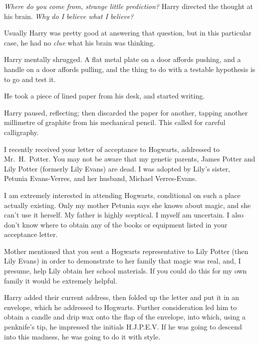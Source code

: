 \emph{Where do you come from, strange little prediction?} Harry directed the
thought at his brain. \emph{Why do I believe what I believe?}

Usually Harry was pretty good at answering that question, but in this
particular case, he had no \emph{clue} what his brain was thinking.

Harry mentally shrugged. A flat metal plate on a door affords pushing, and a
handle on a door affords pulling, and the thing to do with a testable
hypothesis is to go and test it.

He took a piece of lined paper from his desk, and started writing.

\begin{writtenNote}
\end{writtenNote}

Harry paused, reflecting; then discarded the paper for another, tapping another
millimetre of graphite from his mechanical pencil. This called for careful
calligraphy.

\begin{writtenNote}


I recently received your letter of acceptance to Hogwarts, addressed to
Mr.~H.~Potter. You may not be aware that my genetic parents, James Potter and
Lily Potter (formerly Lily Evans) are dead. I was adopted by Lily's sister,
Petunia Evans-Verres, and her husband, Michael Verres-Evans.

I am extremely interested in attending Hogwarts, conditional on such a
place actually existing. Only my mother Petunia says she knows about magic, and
she can't use it herself. My father is highly sceptical. I myself am uncertain.
I also don't know where to obtain any of the books or equipment listed in your
acceptance letter.

Mother mentioned that you sent a Hogwarts representative to Lily Potter
(then Lily Evans) in order to demonstrate to her family that magic was real,
and, I presume, help Lily obtain her school materials. If you could do this for
my own family it would be extremely helpful.

\end{writtenNote}

Harry added their current address, then folded up the letter and put it in an
envelope, which he addressed to Hogwarts. Further consideration led him to
obtain a candle and drip wax onto the flap of the envelope, into which, using a
penknife's tip, he impressed the initials H.J.P.E.V. If he was going to descend
into this madness, he was going to do it with style.

